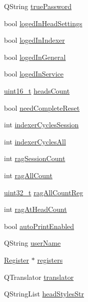 \begin{DoxyCompactItemize}
\item 
Q\+String \mbox{\hyperlink{classMainWindow_a45573d099a3f1c9292c566b787168aec}{true\+Password}}
\item 
bool \mbox{\hyperlink{classMainWindow_aa8aa688516b17c3efab6a28caf771e58}{loged\+In\+Head\+Settings}}
\item 
bool \mbox{\hyperlink{classMainWindow_ac21c269cb5cfa4fdd078cb5ff8dc9633}{loged\+In\+Indexer}}
\item 
bool \mbox{\hyperlink{classMainWindow_a77f5ccbec73adcd6e9f759728d5b7432}{loged\+In\+General}}
\item 
bool \mbox{\hyperlink{classMainWindow_a5baddcb9fe93bad0e0cd3a2272b55209}{loged\+In\+Service}}
\item 
\mbox{\hyperlink{settings_8h_a017dd44e68049ffdd31500a8cd01ba68}{uint16\+\_\+t}} \mbox{\hyperlink{classMainWindow_ac825500f4c4298bc0d7d1dd2a8eeb92b}{heads\+Count}}
\item 
bool \mbox{\hyperlink{classMainWindow_a1a1b01298c3c5e551156b42979f1424f}{need\+Complete\+Reset}}
\item 
int \mbox{\hyperlink{classMainWindow_ac9a80bbcf3f47b2e943482dcbe2a22b6}{indexer\+Cycles\+Session}}
\item 
int \mbox{\hyperlink{classMainWindow_abac49512503987bde5163902aea88ff8}{indexer\+Cycles\+All}}
\item 
int \mbox{\hyperlink{classMainWindow_ae9d373f6b3527dd622b61056db5960ca}{rag\+Session\+Count}}
\item 
int \mbox{\hyperlink{classMainWindow_a66a1308d51a2a1fb60ab4cdbc35c60f6}{rag\+All\+Count}}
\item 
\mbox{\hyperlink{settings_8h_a4196118492a3b1493c81f250e90af775}{uint32\+\_\+t}} \mbox{\hyperlink{classMainWindow_adc85b6b79621bbed931579da596287ef}{rag\+All\+Count\+Reg}}
\item 
int \mbox{\hyperlink{classMainWindow_a29f41984f291911f0bbdd68830b2d9e0}{rag\+At\+Head\+Count}}
\item 
bool \mbox{\hyperlink{classMainWindow_ad1264be93d1c2e447f834cd430337f8f}{auto\+Print\+Enabled}}
\item 
Q\+String \mbox{\hyperlink{classMainWindow_a898b67827c6cce8017f39157be449a6c}{user\+Name}}
\item 
\mbox{\hyperlink{classRegister}{Register}} $\ast$ \mbox{\hyperlink{classMainWindow_aead190b1b4ca3ce95076274ab2ae6f84}{registers}}
\item 
Q\+Translator \mbox{\hyperlink{classMainWindow_a8e829b3590ccdeeada42625415afc6f3}{translator}}
\item 
Q\+String\+List \mbox{\hyperlink{classMainWindow_aec7acc53aaf3436cc02ed0066a72b5a8}{head\+Styles\+Str}}
\end{DoxyCompactItemize}


